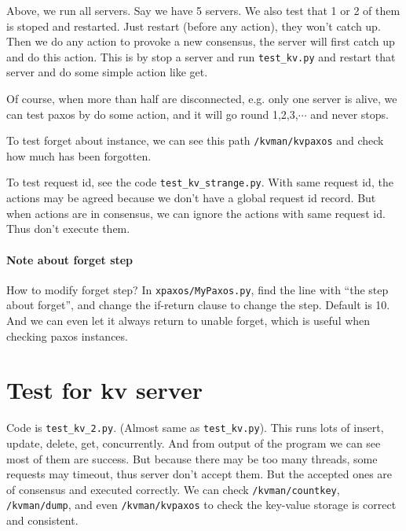 \documentclass{article}
\begin{document}
Above, we run all servers. Say we have 5 servers. We also test that 1 or 2 of them is stoped and restarted. Just restart (before any action), they won't catch up. Then we do any action to provoke a new consensus, the server will first catch up and do this action. This is by stop a server and run \verb|test_kv.py| and restart that server and do some simple action like get.

Of course, when more than half are disconnected, e.g. only one server is alive, we can test paxos by do some action, and it will go round 1,2,3,$\cdots$ and never stops.

To test forget about instance, we can see this path {\tt /kvman/kvpaxos} and check how much has been forgotten.

To test request id, see the code \verb|test_kv_strange.py|. With same request id, the actions may be agreed because we don't have a global request id record. But when actions are in consensus, we can ignore the actions with same request id. Thus don't execute them.

\paragraph{Note about forget step} How to modify forget step? In {\tt xpaxos/MyPaxos.py}, find the line with ``the step about forget'', and change the if-return clause to change the step. Default is 10. And we can even let it always return to unable forget, which is useful when checking paxos instances.

\section{Test for kv server}

Code is \verb|test_kv_2.py|. (Almost same as \verb|test_kv.py|). This runs lots of insert, update, delete, get, concurrently. And from output of the program we can see most of them are success. But because there may be too many threads, some requests may timeout, thus server don't accept them. But the accepted ones are of consensus and executed correctly. We can check {\tt /kvman/countkey}, {\tt /kvman/dump}, and even {\tt /kvman/kvpaxos} to check the key-value storage is correct and consistent.
\end{document}
